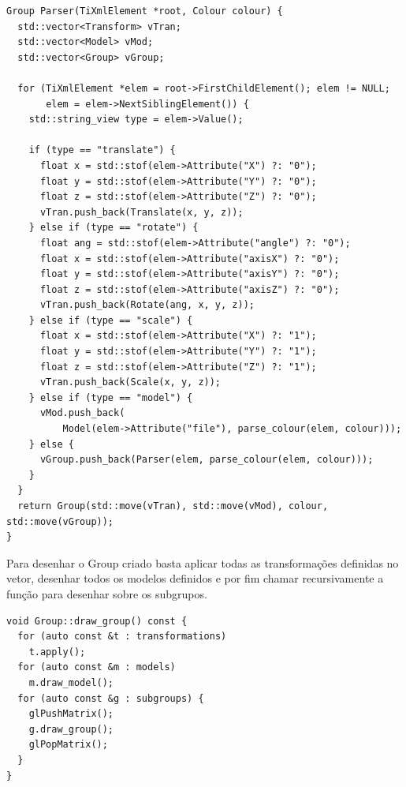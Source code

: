 \documentclass[a4paper]{report}
\begin{document}
\begin{lstlisting}
Group Parser(TiXmlElement *root, Colour colour) {
  std::vector<Transform> vTran;
  std::vector<Model> vMod;
  std::vector<Group> vGroup;

  for (TiXmlElement *elem = root->FirstChildElement(); elem != NULL;
       elem = elem->NextSiblingElement()) {
    std::string_view type = elem->Value();

    if (type == "translate") {
      float x = std::stof(elem->Attribute("X") ?: "0");
      float y = std::stof(elem->Attribute("Y") ?: "0");
      float z = std::stof(elem->Attribute("Z") ?: "0");
      vTran.push_back(Translate(x, y, z));
    } else if (type == "rotate") {
      float ang = std::stof(elem->Attribute("angle") ?: "0");
      float x = std::stof(elem->Attribute("axisX") ?: "0");
      float y = std::stof(elem->Attribute("axisY") ?: "0");
      float z = std::stof(elem->Attribute("axisZ") ?: "0");
      vTran.push_back(Rotate(ang, x, y, z));
    } else if (type == "scale") {
      float x = std::stof(elem->Attribute("X") ?: "1");
      float y = std::stof(elem->Attribute("Y") ?: "1");
      float z = std::stof(elem->Attribute("Z") ?: "1");
      vTran.push_back(Scale(x, y, z));
    } else if (type == "model") {
      vMod.push_back(
          Model(elem->Attribute("file"), parse_colour(elem, colour)));
    } else {
      vGroup.push_back(Parser(elem, parse_colour(elem, colour)));
    }
  }
  return Group(std::move(vTran), std::move(vMod), colour, std::move(vGroup));
}
\end{lstlisting}
Para desenhar o Group criado basta aplicar todas as transformações definidas no
vetor, desenhar todos os modelos definidos e por fim chamar recursivamente a
função para desenhar sobre os subgrupos.

\begin{lstlisting}
void Group::draw_group() const {
  for (auto const &t : transformations)
    t.apply();
  for (auto const &m : models)
    m.draw_model();
  for (auto const &g : subgroups) {
    glPushMatrix();
    g.draw_group();
    glPopMatrix();
  }
}
\end{lstlisting}
\end{document}
